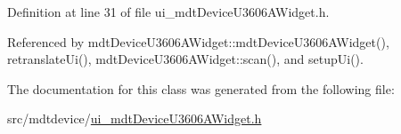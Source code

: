 Definition at line 31 of file ui\-\_\-mdt\-Device\-U3606\-A\-Widget.\-h.



Referenced by mdt\-Device\-U3606\-A\-Widget\-::mdt\-Device\-U3606\-A\-Widget(), retranslate\-Ui(), mdt\-Device\-U3606\-A\-Widget\-::scan(), and setup\-Ui().



The documentation for this class was generated from the following file\-:\begin{DoxyCompactItemize}
\item 
src/mdtdevice/\hyperlink{ui__mdt_device_u3606_a_widget_8h}{ui\-\_\-mdt\-Device\-U3606\-A\-Widget.\-h}\end{DoxyCompactItemize}
